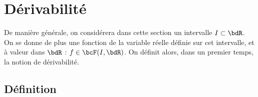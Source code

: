 \documentclass[a4paper,french,bookmarks]{article}
\begin{document}

\initcours{}

\section{Dérivabilité}

De manière générale, on considérera dans cette section un intervalle $I \subset \bdR$. On se donne de plus une fonction de la variable réelle définie sur cet intervalle, et à valeur dans $\bdR$ : $f \in \bcF(I, \bdR)$. On définit alors, dans un premier temps, la notion de dérivabilité.

\subsection{Définition}
\end{document}
